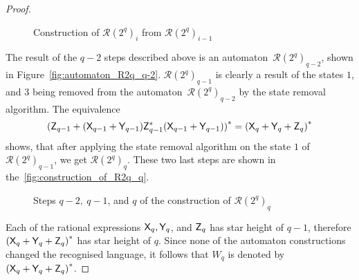 \begin{proof}
    \begin{figure}[h]%
        \centerline{
            \hspace{-25pt}%
            \quad
            \quad
        }
        \caption{Construction of ${\mathcal{R}(2^q)}_i$ from ${\mathcal{R}(2^q)}_{i-1}$}\label{fig:construction_of_R2q_i}%
    \end{figure}

    The result of the $q-2$ steps described above is an automaton~${\mathcal{R}(2^q)}_{q-2}$, shown in Figure~\ref*{fig:automaton_R2q_q-2}. ${\mathcal{R}(2^q)}_{q-1}$ is clearly a result of the states $1$, and $3$ being removed from the automaton~${\mathcal{R}(2^q)}_{q-2}$ by the state removal algorithm. The equivalence
    \[
        {({\mathsf{Z}}_{q-1} + {({\mathsf{X}}_{q-1} + {\mathsf{Y}}_{q-1})}{\mathsf{Z}}_{q-1}^*{({\mathsf{X}}_{q-1} + {\mathsf{Y}}_{q-1})})}^* = {({\mathsf{X}}_q + {\mathsf{Y}}_q + {\mathsf{Z}}_q)}^*
    \]
    shows, that after applying the state removal algorithm on the state $1$ of ${\mathcal{R}(2^q)}_{q-1}$, we get ${\mathcal{R}(2^q)}_{q}$. These two last steps are shown in the~\autoref*{fig:construction_of_R2q_q}. 

    \begin{figure}[h]%
        \centerline{
            \hspace{-25pt}%
            \quad
            \quad
        }
        \caption{Steps $q-2, \: q-1$, and $q$ of the construction of ${\mathcal{R}(2^q)}_q$}\label{fig:construction_of_R2q_q}%
    \end{figure}

    Each of the rational expressions ${\mathsf{X}}_q, {\mathsf{Y}}_q$, and ${\mathsf{Z}}_q$ has star height of $q-1$, therefore ${({\mathsf{X}}_q + {\mathsf{Y}}_q + {\mathsf{Z}}_q)}^*$ has star height of $q$. Since none of the automaton constructions changed the recognised language, it follows that $W_q$ is denoted by ${({\mathsf{X}}_q + {\mathsf{Y}}_q + {\mathsf{Z}}_q)}^*$.
\end{proof}

